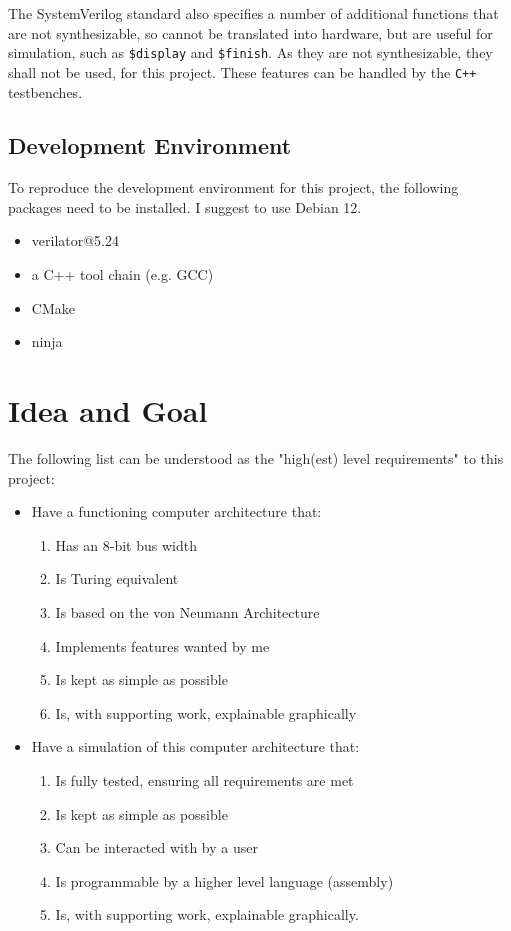 The SystemVerilog standard also specifies a number of additional functions that are not synthesizable, so cannot be translated into hardware, but are useful for simulation, such as \texttt{\$display} and \texttt{\$finish}. As they are not synthesizable, they shall not be used, for this project. These features can be handled by the \texttt{C++} testbenches.

\subsection{Development Environment}
To reproduce the development environment for this project, the following packages need to be installed. I suggest to use Debian 12. 

\begin{itemize}
  \item verilator@5.24
  \item a C++ tool chain (e.g. GCC)
  \item CMake
  \item ninja
\end{itemize}
  
\section{Idea and Goal} \label{sec:goal}

The following list can be understood as the "high(est) level requirements" to this project:
\begin{itemize}
  \item Have a functioning computer architecture that:
 \begin{enumerate}
    \item Has an 8-bit bus width
    \item Is Turing equivalent
    \item Is based on the von Neumann Architecture
    \item Implements features wanted by me
    \item Is kept as simple as possible
    \item Is, with supporting work, explainable graphically
  \end{enumerate}
  \item Have a simulation of this computer architecture that: 
  \begin{enumerate}
    \item Is fully tested, ensuring all requirements are met
    \item Is kept as simple as possible
    \item Can be interacted with by a user
    \item Is programmable by a higher level language (assembly)
    \item Is, with supporting work, explainable graphically.
  \end{enumerate}
\end{itemize}

